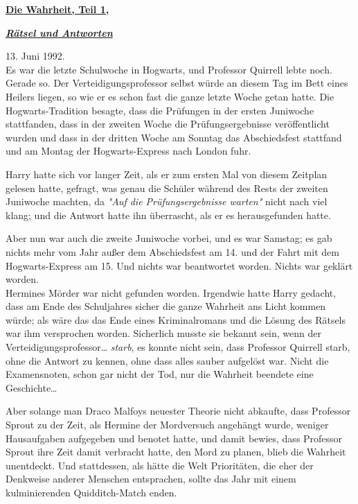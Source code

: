 

\hypertarget{die-wahrheit-teil-1}{%

\textbf{\uline{Die Wahrheit, Teil 1,}}

\textbf{\emph{\uline{Rätsel und Antworten}}}

13. Juni 1992.\\ Es war die letzte Schulwoche in Hogwarts, und Professor Quirrell lebte noch. Gerade so. Der Verteidigungsprofessor selbst würde an diesem Tag im Bett eines Heilers liegen, so wie er es schon fast die ganze letzte Woche getan hatte. Die Hogwarts-Tradition besagte, dass die Prüfungen in der ersten Juniwoche stattfanden, dass in der zweiten Woche die Prüfungsergebnisse veröffentlicht wurden und dass in der dritten Woche am Sonntag das Abschiedsfest stattfand und am Montag der Hogwarts-Express nach London fuhr.

Harry hatte sich vor langer Zeit, als er zum ersten Mal von diesem Zeitplan gelesen hatte, gefragt, was genau die Schüler während des Rests der zweiten Juniwoche machten, da \emph{"Auf die Prüfungsergebnisse warten"} nicht nach viel klang; und die Antwort hatte ihn überrascht, als er es herausgefunden hatte.

Aber nun war auch die zweite Juniwoche vorbei, und es war Samstag; es gab nichts mehr vom Jahr außer dem Abschiedsfest am 14. und der Fahrt mit dem Hogwarts-Express am 15. Und nichts war beantwortet worden. Nichts war geklärt worden.\\ Hermines Mörder war nicht gefunden worden. Irgendwie hatte Harry gedacht, dass am Ende des Schuljahres sicher die ganze Wahrheit ans Licht kommen würde; als wäre das das Ende eines Kriminalromans und die Lösung des Rätsels war ihm versprochen worden. Sicherlich musste sie bekannt sein, wenn der Verteidigungsprofessor… \emph{starb}, es konnte nicht sein, dass Professor Quirrell starb, ohne die Antwort zu kennen, ohne dass alles sauber aufgelöst war. Nicht die Examensnoten, schon gar nicht der Tod, nur die Wahrheit beendete eine Geschichte…

Aber solange man Draco Malfoys neuester Theorie nicht abkaufte, dass Professor Sprout zu der Zeit, als Hermine der Mordversuch angehängt wurde, weniger Hausaufgaben aufgegeben und benotet hatte, und damit bewies, dass Professor Sprout ihre Zeit damit verbracht hatte, den Mord zu planen, blieb die Wahrheit unentdeckt. Und stattdessen, als hätte die Welt Prioritäten, die eher der Denkweise anderer Menschen entsprachen, sollte das Jahr mit einem kulminierenden Quidditch-Match enden.

}
